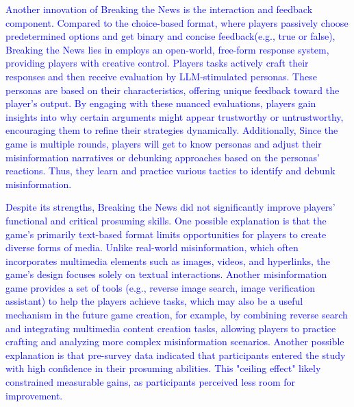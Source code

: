 \textcolor{blue}{Another innovation of Breaking the News is the interaction and feedback component. Compared to the choice-based format, where players passively choose predetermined options and get binary and concise feedback(e.g., true or false), Breaking the News lies in employs an open-world, free-form response system, providing players with creative control. Players tasks actively craft their responses and then receive evaluation by LLM-stimulated personas. These personas are based on their characteristics, offering unique feedback toward the player’s output. By engaging with these nuanced evaluations, players gain insights into why certain arguments might appear trustworthy or untrustworthy, encouraging them to refine their strategies dynamically. Additionally, Since the game is multiple rounds, players will get to know personas and adjust their misinformation narratives or debunking approaches based on the personas’ reactions. Thus, they learn and practice various tactics to identify and debunk misinformation.}

\textcolor{blue}{Despite its strengths, Breaking the News did not significantly improve players’ functional and critical prosuming skills. One possible explanation is that the game's primarily text-based format limits opportunities for players to create diverse forms of media. Unlike real-world misinformation, which often incorporates multimedia elements such as images, videos, and hyperlinks, the game’s design focuses solely on textual interactions. Another misinformation game provides a set of tools (e.g., reverse image search, image verification assistant) to help the players achieve tasks, which may also be a useful mechanism in the future game creation\cite{katsaounidou2019mathe}, for example, by combining reverse search and integrating multimedia content creation tasks, allowing players to practice crafting and analyzing more complex misinformation scenarios. Another possible explanation is that pre-survey data indicated that participants entered the study with high confidence in their prosuming abilities. This "ceiling effect" likely constrained measurable gains, as participants perceived less room for improvement.}

